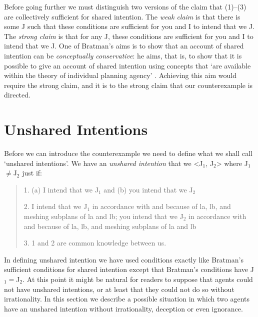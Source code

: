 \documentclass[12pt,\papersize]{extarticle}
\begin{document}
Before going further we must distinguish two versions of the claim that (1)--(3) are collectively sufficient for shared intention.
The \emph{weak claim} is that there is some J such that these conditions are sufficient for you and I to intend that we J.
The \emph{strong claim} is that for any J, these conditions are sufficient for you and I to intend that we J.
One of Bratman's aims is to show that an account of shared intention can be \emph{conceptually conservative}:
he aims, that is, to show that it is possible to give an account of shared intention using concepts that `are available within the theory of individual planning agency' \citep[p.\ 163]{Bratman:2009lv}.  
Achieving this aim would require the strong claim, and it is to the strong claim that our counterexample is directed. 




\section{Unshared Intentions}
Before we can introduce the counterexample we need to define what we shall call `unshared intentions'.
We have an \emph{unshared intention} that we <J$_1$, J$_2$> where J$_1$$\neq$J$_2$ just if:
%
\begin{quote}
\label{df:unshared_intention}
1. (a) I intend that we J$_1$ and (b) you intend that we J$_2$
 
2. I intend that we J$_1$ in accordance with and because of la, lb, and meshing subplans of la and lb; you intend that we J$_2$ in accordance with and because of la, lb, and meshing subplans of la and lb
 
3. 1 and 2 are common knowledge between us.
\end{quote}
In defining unshared intention we have used conditions exactly like Bratman's sufficient conditions for shared intention except that Bratman's conditions have J$_1$$=$J$_2$.
At this point it might be natural for readers to suppose that agents could not have unshared intentions,
or at least that they could not do so without irrationality.
In this section we describe a possible situation in which two agents  have an unshared intention without irrationality, deception or even ignorance.
\end{document}
